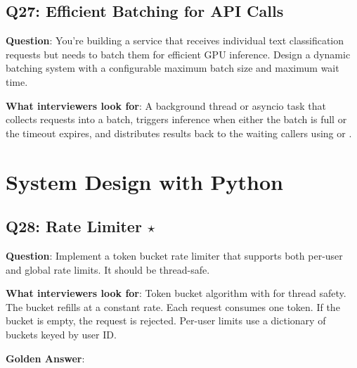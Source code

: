 \subsection{Q27: Efficient Batching for API Calls}

\textbf{Question}: You're building a service that receives individual text classification requests but needs to batch them for efficient GPU inference. Design a dynamic batching system with a configurable maximum batch size and maximum wait time.

\textbf{What interviewers look for}: A background thread or asyncio task that collects requests into a batch, triggers inference when either the batch is full or the timeout expires, and distributes results back to the waiting callers using  or .


\section{System Design with Python}

\subsection{Q28: Rate Limiter $\star$}

\textbf{Question}: Implement a token bucket rate limiter that supports both per-user and global rate limits. It should be thread-safe.

\textbf{What interviewers look for}: Token bucket algorithm with  for thread safety. The bucket refills at a constant rate. Each request consumes one token. If the bucket is empty, the request is rejected. Per-user limits use a dictionary of buckets keyed by user ID.

\textbf{Golden Answer}:

